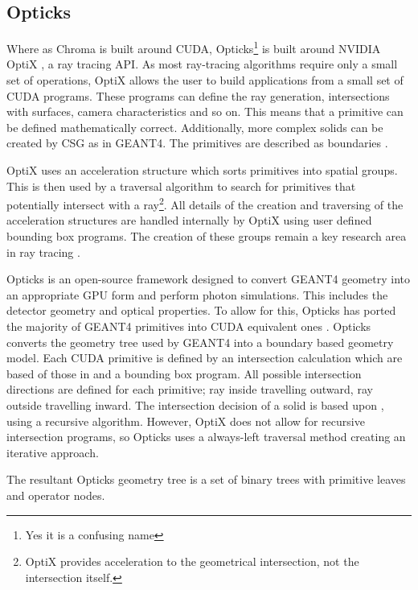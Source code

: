 \subsection{Opticks}
\par
Where as Chroma is built around CUDA, Opticks\footnote{Yes it is a confusing name} is built around NVIDIA OptiX \cite{nvidia_optix_paper_ref}, a ray tracing API.
As most ray-tracing algorithms require only a small set of operations, OptiX allows the user to build applications from a small set of CUDA programs.
These programs can define the ray generation, intersections with surfaces, camera characteristics and so on.
This means that a primitive can be defined mathematically correct.
Additionally, more complex solids can be created by CSG as in GEANT4.
The primitives are described as boundaries  \cite{real_time_collision_detection_ref}.
\par
OptiX uses an acceleration structure which sorts primitives into spatial groups.
This is then used by a traversal algorithm to search for primitives that potentially intersect with a ray\footnote{OptiX provides acceleration to the geometrical intersection, not the intersection itself.}.
All details of the creation and traversing of the acceleration structures are handled internally by OptiX using user defined bounding box programs.
The creation of these groups remain a key research area in ray tracing \cite{NVIDIA_OptiX_GPU_Ray_Tracing_ACM_paper_ref,accelerated_bvh_ref}.
\par
Opticks is an open-source framework designed to convert GEANT4 geometry into an appropriate GPU form and perform photon simulations.
This includes the detector geometry and optical properties.
To allow for this, Opticks has ported the majority of GEANT4 primitives into CUDA equivalent ones \cite{Opticks_CHEP_2019_ref}.
Opticks converts the geometry tree used by GEANT4 into a boundary based geometry model.
Each CUDA primitive is defined by an intersection calculation which are based of those in \cite{real_time_collision_detection_ref} and a bounding box program.
All possible intersection directions are defined for each primitive; ray inside travelling outward, ray outside travelling inward.
The intersection decision of a solid is based upon \cite{CSG_Intersection_ref}, using a recursive algorithm.
However, OptiX does not allow for recursive intersection programs, so Opticks uses a always-left traversal method creating an iterative approach.
\par
The resultant Opticks geometry tree is a set of binary trees with primitive leaves and operator nodes.
